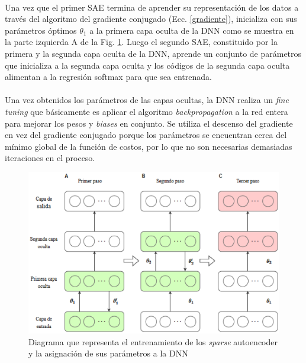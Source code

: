 \documentclass[12pt]{article}%
\begin{document}
\paragraph{}
Una vez que el primer SAE termina de aprender su representación de los datos a través del algoritmo del gradiente conjugado (Ecc. \ref{gradiente}), inicializa con sus parámetros óptimos $\theta_{1}$ a la primera capa oculta de la DNN como se muestra en la parte izquierda A de la Fig. \ref{fig:deepnet}. Luego el segundo SAE, constituido por la primera y la segunda capa oculta de la DNN, aprende un conjunto de parámetros que inicializa a la segunda capa oculta y los códigos de la segunda capa oculta alimentan a la regresión softmax para que sea entrenada.

\paragraph{}
Una vez obtenidos los parámetros de las capas ocultas, la DNN realiza un \textit{fine tuning} que básicamente es aplicar el algoritmo \textit{backpropagation} a la red entera para mejorar los pesos y \textit{biases} en conjunto. Se utiliza el descenso del gradiente en vez del gradiente conjugado porque los parámetros se encuentran cerca del mínimo global de la función de costos, por lo que no son necesarias demasiadas iteraciones en el proceso.

\begin{figure}[ht]
  \centering
    \includegraphics[scale=0.9]{./training.eps}
  \caption{Diagrama que representa el entrenamiento de los \textit{sparse} autoencoder y la asignación de sus parámetros a la DNN}
  \label{fig:deepnet}
\end{figure}
\end{document}
